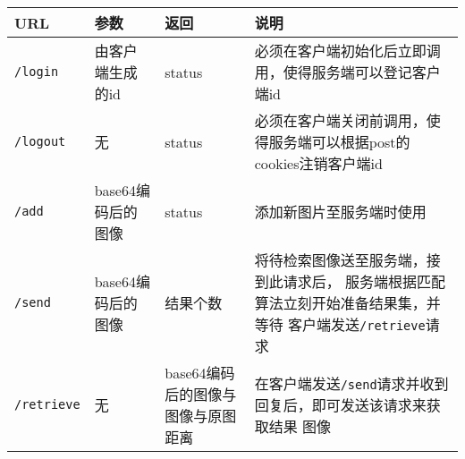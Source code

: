 
\begin{center}
  \begin{tabular}{| l | p{2cm} | p{2cm} | p{5cm} |}
    \hline
    URL & 参数 & 返回 & 说明 \\
    \hline
    \texttt{/login}
  & 由客户端生成的id
  & status
  & 必须在客户端初始化后立即调用，使得服务端可以登记客户端id \\
    \hline
    \texttt{/logout}
  & 无
  & status
  & 必须在客户端关闭前调用，使得服务端可以根据post的cookies注销客户端id \\
    \hline
    \texttt{/add}
  & base64编码后的图像
  & status
  & 添加新图片至服务端时使用 \\
    \hline
    \texttt{/send}
  & base64编码后的图像
  & 结果个数
  & 将待检索图像送至服务端，接到此请求后，
    服务端根据匹配算法立刻开始准备结果集，并等待
    客户端发送\texttt{/retrieve}请求 \\
    \hline
    \texttt{/retrieve}
  & 无
  & base64编码后的图像与图像与原图距离
  & 在客户端发送\texttt{/send}请求并收到回复后，即可发送该请求来获取结果
    图像 \\
    \hline
  \end{tabular}
\end{center}

